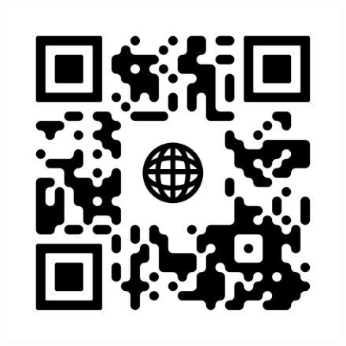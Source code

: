 \documentclass[10pt,A4]{article}
\begin{document}
\begin{figure}[H]
\begin{center}
	\includegraphics[width=0.17\linewidth]{qr-code.png}	%
\end{center}
\end{figure}



\vspace*{\fill}
\hspace{-0.25\linewidth}\colorbox{bgcol}{\makebox[1.5\linewidth][c]{ \small \textcolor{white}{***}}}

%
%
\end{document}
